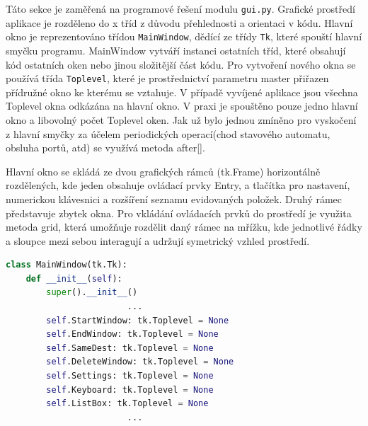 

Táto sekce je zaměřená na programové řešení modulu \texttt{gui.py}. Grafické prostředí aplikace je rozděleno do x tříd z důvodu přehlednosti a orientaci v kódu. Hlavní okno je reprezentováno třídou \texttt{MainWindow}, dědící ze třídy \texttt{Tk}, které spouští hlavní smyčku programu. MainWindow vytváří instanci ostatních tříd, které obsahují kód ostatních oken nebo jinou složitější část kódu. Pro vytvoření nového okna se používá třída \texttt{Toplevel}, které je prostřednictví parametru master přiřazen přídružné okno ke kterému se vztahuje. V případě vyvíjené aplikace jsou všechna Toplevel okna odkázána na hlavní okno. V praxi je spouštěno pouze jedno hlavní okno a libovolný počet Toplevel oken. Jak už bylo jednou zmíněno pro vyskočení z hlavní smyčky za účelem periodických operací(chod stavového automatu, obsluha portů, atd) se využívá metoda after[].

Hlavní okno se skládá ze dvou grafických rámců (tk.Frame) horizontálně rozdělených, kde jeden obsahuje ovládací prvky Entry, a tlačítka pro nastavení, numerickou klávesnici a rozšíření seznamu evidovaných položek. Druhý rámec představuje zbytek okna. Pro vkládání ovládacích prvků do prostředí je využita metoda grid, která umožňuje rozdělit daný rámec na mřížku, kde jednotlivé řádky a sloupce mezi sebou interagují a udržují symetrický vzhled prostředí.



\begin{lstlisting}[language=Python, caption=Funkce stavového automatu, frame=single, breaklines=false]
class MainWindow(tk.Tk):
    def __init__(self):
        super().__init__()
                        ...                       
        self.StartWindow: tk.Toplevel = None
        self.EndWindow: tk.Toplevel = None
        self.SameDest: tk.Toplevel = None
        self.DeleteWindow: tk.Toplevel = None
        self.Settings: tk.Toplevel = None
        self.Keyboard: tk.Toplevel = None
        self.ListBox: tk.Toplevel = None
                        ...
\end{lstlisting}

